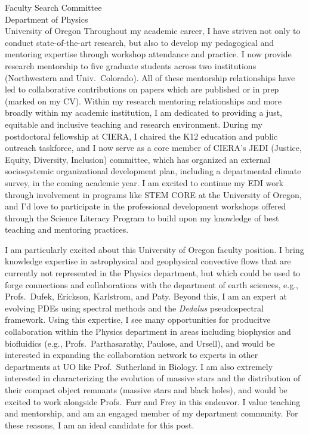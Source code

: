 \documentclass[11pt]{letter}
\begin{document}
\begin{letter}{
               Faculty Search Committee \\
               Department of Physics \\
               University of Oregon
           }
    Throughout my academic career, I have striven not only to conduct state-of-the-art research, but also to develop my pedagogical and mentoring expertise through workshop attendance and practice.
    I now provide research mentorship to five graduate students across two institutions (Northwestern and Univ.~Colorado).
    All of these mentorship relationships have led to collaborative contributions on papers which are published or in prep (marked on my CV).
    Within my research mentoring relationships and more broadly within my academic institution, I am dedicated to providing a just, equitable and inclusive teaching and research environment.
    During my postdoctoral fellowship at CIERA, I chaired the K12 education and public outreach taskforce, and I now serve as a core member of CIERA's JEDI (Justice, Equity, Diversity, Inclusion) committee, which has organized an external sociosystemic organizational development plan, including a departmental climate survey, in the coming academic year.
    I am excited to continue my EDI work through involvement in programs like STEM CORE at the University of Oregon, and I'd love to participate in the professional development workshops offered through the Science Literacy Program to build upon my knowledge of best teaching and mentoring practices.

    I am particularly excited about this University of Oregon faculty position.
    I bring knowledge expertise in astrophysical and geophysical convective flows that are currently not represented in the Physics department, but which could be used to forge connections and collaborations with the department of earth sciences, e.g., Profs.~Dufek, Erickson, Karlstrom, and Paty.
    Beyond this, I am an expert at evolving PDEs using spectral methods and the \emph{Dedalus} pseudospectral framework.
    Using this expertise, I see many opportunities for producitve collaboration within the Physics department in areas including biophysics and biofluidics (e.g., Profs.~Parthasarathy, Paulose, and Ursell), and would be interested in expanding the collaboration network to experts in other departments at UO like Prof.~Sutherland in Biology.
    I am also extremely interested in characterizing the evolution of massive stars and the distribution of their compact object remnants (massive stars and black holes), and would be excited to work alongside Profs.~Farr and Frey in this endeavor.
    I value teaching and mentorship, and am an engaged member of my department community.
    For these reasons, I am an ideal candidate for this post.


\end{letter}
\end{document}
